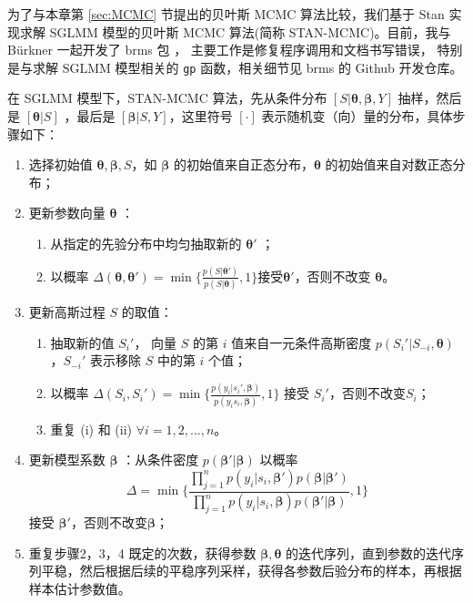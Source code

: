 \documentclass[12pt,a4paper,UTF8,twoside]{book}
\providecommand{\tightlist}{%
  \setlength{\itemsep}{0pt}\setlength{\parskip}{0pt}}
\theoremstyle{definition}
\theoremstyle{definition}
\theoremstyle{definition}
\theoremstyle{remark}
\begin{document}
为了与本章第 \ref{sec:MCMC} 节提出的贝叶斯 MCMC 算法比较，我们基于 Stan
实现求解 SGLMM 模型的贝叶斯 MCMC 算法(简称 STAN-MCMC)。目前，我与
Bürkner 一起开发了 brms 包 \citep{brms2017JSS}，
主要工作是修复程序调用和文档书写错误， 特别是与求解 SGLMM 模型相关的
\texttt{gp} 函数，相关细节见 brms 的 Github 开发仓库。

在 SGLMM 模型下，STAN-MCMC 算法，先从条件分布
\([S|\boldsymbol{\theta},\boldsymbol{\beta},Y]\) 抽样，然后是
\([\boldsymbol{\theta}|S]\) ，最后是
\([\boldsymbol{\beta}|S,Y]\)，这里符号 \([\cdot]\)
表示随机变（向）量的分布，具体步骤如下：

\begin{enumerate}
\def\labelenumi{\arabic{enumi}.}
\tightlist
\item
  选择初始值 \(\boldsymbol{\theta},\boldsymbol{\beta},S\)，如
  \(\boldsymbol{\beta}\) 的初始值来自正态分布，\(\boldsymbol{\theta}\)
  的初始值来自对数正态分布；
\item
  更新参数向量 \(\boldsymbol{\theta}\) ：

  \begin{enumerate}
  \def\labelenumii{(\roman{enumii})}
  \tightlist
  \item
    从指定的先验分布中均匀抽取新的 \(\boldsymbol{\theta}'\) ；
  \item
    以概率
    \(\Delta(\boldsymbol{\theta},\boldsymbol{\theta}') = \min \big\{\frac{p(S|\boldsymbol{\theta}')}{p(S|\boldsymbol{\theta})},1\big\}\)接受\(\boldsymbol{\theta}'\)，否则不改变
    \(\boldsymbol{\theta}\)。
  \end{enumerate}
\item
  更新高斯过程 \(S\) 的取值：

  \begin{enumerate}
  \def\labelenumii{(\roman{enumii})}
  \tightlist
  \item
    抽取新的值 \(S_{i}'\)， 向量 \(S\) 的第 \(i\) 值来自一元条件高斯密度
    \(p(S_{i}'|S_{-i},\boldsymbol{\theta})\)，\(S_{-i}'\) 表示移除 \(S\)
    中的第 \(i\) 个值；
  \item
    以概率
    \(\Delta(S_{i},S_{i}') = \min\big\{ \frac{p(y_{i}|s_{i}',\boldsymbol{\beta})}{p(y_{i}s_{i},\boldsymbol{\beta})},1 \big\}\)
    接受 \(S_{i}'\)，否则不改变\(S_i\)；
  \item
    重复 (i) 和 (ii) \(\forall i = 1,2,\ldots,n\)。
  \end{enumerate}
\item
  更新模型系数 \(\boldsymbol{\beta}\) ：从条件密度
  \(p(\boldsymbol{\beta}'|\boldsymbol{\beta})\) 以概率
  \[\Delta = \min \big\{ \frac{\prod_{j=1}^{n}p(y_i|s_{i},\boldsymbol{\beta}')p(\boldsymbol{\beta}|\boldsymbol{\beta}')}{\prod_{j=1}^{n}p(y_i|s_{i},\boldsymbol{\beta})p(\boldsymbol{\beta}'|\boldsymbol{\beta})},1  \big\}\]
  接受 \(\boldsymbol{\beta}'\)，否则不改变\(\boldsymbol{\beta}\)；
\item
  重复步骤2，3，4 既定的次数，获得参数
  \(\boldsymbol{\beta},\boldsymbol{\theta}\)
  的迭代序列，直到参数的迭代序列平稳，然后根据后续的平稳序列采样，获得各参数后验分布的样本，再根据样本估计参数值。
\end{enumerate}
\end{document}
